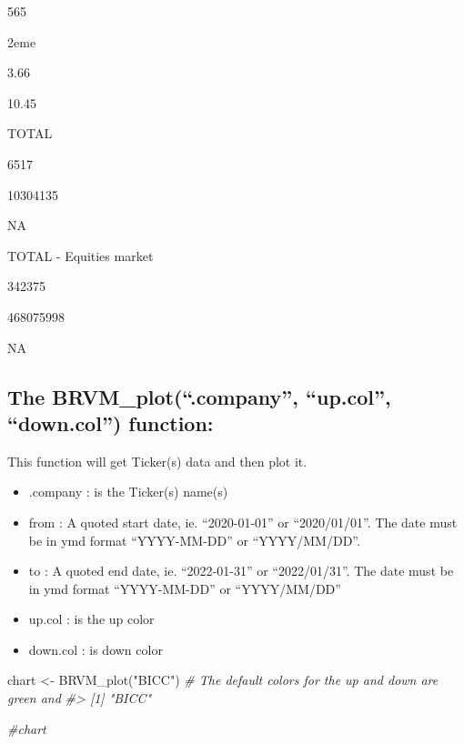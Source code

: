 \documentclass[
]{article}
\newenvironment{Shaded}{\begin{snugshade}}{\end{snugshade}}
\newcommand{\CommentTok}[1]{\textcolor[rgb]{0.56,0.35,0.01}{\textit{#1}}}
\newcommand{\FunctionTok}[1]{\textcolor[rgb]{0.00,0.00,0.00}{#1}}
\newcommand{\NormalTok}[1]{#1}
\newcommand{\OtherTok}[1]{\textcolor[rgb]{0.56,0.35,0.01}{#1}}
\newcommand{\StringTok}[1]{\textcolor[rgb]{0.31,0.60,0.02}{#1}}
\providecommand{\tightlist}{%
  \setlength{\itemsep}{0pt}\setlength{\parskip}{0pt}}
\begin{document}
565

2eme

3.66

10.45

TOTAL

6517

10304135

{ }

{ NA }

TOTAL - Equities market

342375

468075998

{ }

{ NA }

\hypertarget{the-brvm_plot.company-up.col-down.col-function}{%
\subsection{\texorpdfstring{The \textbf{BRVM\_plot(``.company'',
``up.col'', ``down.col'')}
function:}{The BRVM\_plot(``.company'', ``up.col'', ``down.col'') function:}}\label{the-brvm_plot.company-up.col-down.col-function}}

This function will get Ticker(s) data and then plot it.

\begin{itemize}
\tightlist
\item
  .company : is the Ticker(s) name(s)
\item
  from : A quoted start date, ie. ``2020-01-01'' or ``2020/01/01''. The
  date must be in ymd format ``YYYY-MM-DD'' or ``YYYY/MM/DD''.
\item
  to : A quoted end date, ie. ``2022-01-31'' or ``2022/01/31''. The date
  must be in ymd format ``YYYY-MM-DD'' or ``YYYY/MM/DD''
\item
  up.col : is the up color
\item
  down.col : is down color
\end{itemize}

\begin{Shaded}
\begin{Highlighting}[]

\NormalTok{chart }\OtherTok{\textless{}{-}} \FunctionTok{BRVM\_plot}\NormalTok{(}\StringTok{"BICC"}\NormalTok{) }\CommentTok{\# The default colors for the up and down are green and }
\CommentTok{\#\textgreater{} [1] "BICC"}

\CommentTok{\#chart}
\end{Highlighting}
\end{Shaded}
\end{document}

